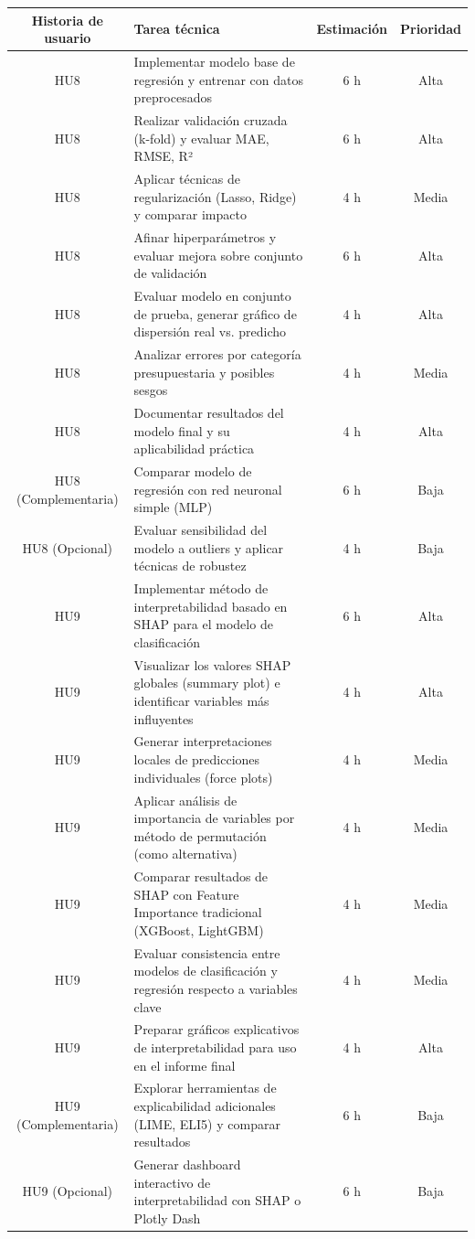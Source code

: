 \documentclass[
11pt, %
]{charter}
\begin{document}
\begin{table}[htpb]
\centering
\begin{tabularx}{\linewidth}{@{}|c|X|c|c|@{}}
\hline
\rowcolor[HTML]{C0C0C0}
Historia de usuario & Tarea técnica & Estimación & Prioridad \\ \hline

HU8 & Implementar modelo base de regresión y entrenar con datos preprocesados & 6 h & Alta \\ \hline
HU8 & Realizar validación cruzada (k-fold) y evaluar MAE, RMSE, R² & 6 h & Alta \\ \hline
HU8 & Aplicar técnicas de regularización (Lasso, Ridge) y comparar impacto & 4 h & Media \\ \hline
HU8 & Afinar hiperparámetros y evaluar mejora sobre conjunto de validación & 6 h & Alta \\ \hline
HU8 & Evaluar modelo en conjunto de prueba, generar gráfico de dispersión real vs. predicho & 4 h & Alta \\ \hline
HU8 & Analizar errores por categoría presupuestaria y posibles sesgos & 4 h & Media \\ \hline
HU8 & Documentar resultados del modelo final y su aplicabilidad práctica & 4 h & Alta \\ \hline


HU8 (Complementaria) & Comparar modelo de regresión con red neuronal simple (MLP) & 6 h & Baja \\ \hline
HU8 (Opcional) & Evaluar sensibilidad del modelo a outliers y aplicar técnicas de robustez & 4 h & Baja \\ \hline

HU9 & Implementar método de interpretabilidad basado en SHAP para el modelo de clasificación & 6 h & Alta \\ \hline
HU9 & Visualizar los valores SHAP globales (summary plot) e identificar variables más influyentes & 4 h & Alta \\ \hline
HU9 & Generar interpretaciones locales de predicciones individuales (force plots) & 4 h & Media \\ \hline
HU9 & Aplicar análisis de importancia de variables por método de permutación (como alternativa) & 4 h & Media \\ \hline
HU9 & Comparar resultados de SHAP con Feature Importance tradicional (XGBoost, LightGBM) & 4 h & Media \\ \hline
HU9 & Evaluar consistencia entre modelos de clasificación y regresión respecto a variables clave & 4 h & Media \\ \hline
HU9 & Preparar gráficos explicativos de interpretabilidad para uso en el informe final & 4 h & Alta \\ \hline
HU9 (Complementaria) & Explorar herramientas de explicabilidad adicionales (LIME, ELI5) y comparar resultados & 6 h & Baja \\ \hline
HU9 (Opcional) & Generar dashboard interactivo de interpretabilidad con SHAP o Plotly Dash & 6 h & Baja \\ \hline


\end{tabularx}
\end{table}
\end{document}
